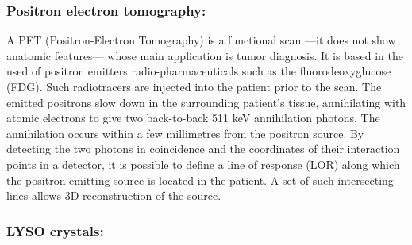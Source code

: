
\subsubsection*{Positron electron tomography:}

A PET (Positron-Electron Tomography) is a functional scan ---it does not show anatomic features--- whose main application is tumor diagnosis. It is based in the used of positron emitters radio-pharmaceuticals such as the fluorodeoxyglucose (FDG). Such radiotracers 
are injected into the patient prior to the scan. The emitted positrons slow down in the surrounding patient’s tissue, annihilating with atomic electrons to give two back-to-back 511 keV annihilation photons. The annihilation occurs within a few millimetres from the positron source. By detecting the two photons in coincidence and the coordinates of their interaction points in a detector, it is possible to define a line of response (LOR) along which the positron emitting source is located in the patient. A set of such intersecting lines allows 3D reconstruction of the source. 


\subsubsection*{LYSO crystals:}

